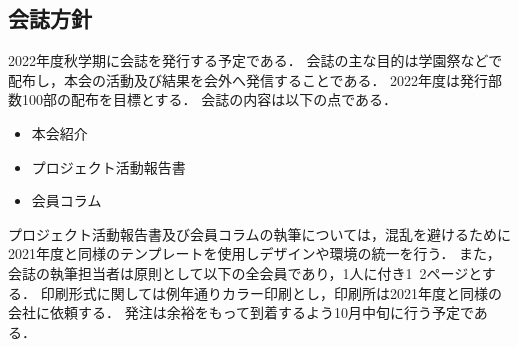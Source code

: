 \subsection*{会誌方針}








2022年度秋学期に会誌を発行する予定である．
会誌の主な目的は学園祭などで配布し，本会の活動及び結果を会外へ発信することである．
2022年度は発行部数100部の配布を目標とする．
会誌の内容は以下の点である．
\begin{itemize}
	\item 本会紹介
	\item プロジェクト活動報告書
	\item 会員コラム
\end{itemize}
プロジェクト活動報告書及び会員コラムの執筆については，混乱を避けるために2021年度と同様のテンプレートを使用しデザインや環境の統一を行う．
また，会誌の執筆担当者は原則として\thirdGrade{}以下の全会員であり，1人に付き1~2ページとする．
印刷形式に関しては例年通りカラー印刷とし，印刷所は2021年度と同様の会社に依頼する．
発注は余裕をもって到着するよう10月中旬に行う予定である．
